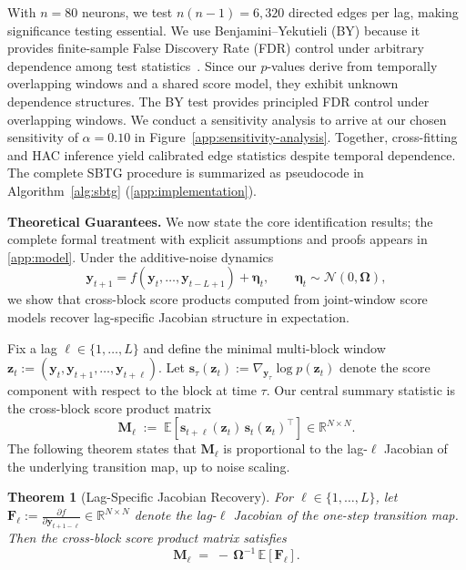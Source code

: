 \documentclass{article}
\theoremstyle{plain}
\newtheorem{theorem}{Theorem}[section]
\theoremstyle{definition}
\theoremstyle{remark}
\newcommand{\R}{\mathbb{R}}
\newcommand{\E}{\mathbb{E}}
\newcommand{\1}{\mathbf{1}}
\newcommand{\y}{\bm{y}}
\newcommand{\z}{\bm{z}}
\newcommand{\s}{\bm{s}}
\begin{document}
With $n=80$ neurons, we test $n(n-1)=6{,}320$ directed edges per lag, making significance testing essential.
We use Benjamini--Yekutieli (BY) because it provides finite-sample False Discovery Rate (FDR) control under arbitrary dependence among test statistics~\citep{BenjaminiYekutieli2001}. Since our $p$-values derive from temporally overlapping windows and a shared score model, they exhibit unknown dependence structures. The BY test provides principled FDR control under overlapping windows. We conduct a sensitivity analysis to arrive at our chosen sensitivity of $\alpha = 0.10$ in Figure~\ref{app:sensitivity-analysis}. Together, cross-fitting and HAC inference yield calibrated edge statistics despite temporal dependence. The complete SBTG procedure is summarized as pseudocode in Algorithm~\ref{alg:sbtg} (\cref{app:implementation}).

\label{sec:theory}
\textbf{Theoretical Guarantees.} We now state the core identification results; the complete formal treatment with explicit assumptions and proofs appears in \cref{app:model}. Under the additive-noise dynamics
\begin{equation}
\y_{t+1} = f(\y_t, \ldots, \y_{t-L+1}) + \bm{\eta}_t,
\qquad
\bm{\eta}_t \sim \mathcal{N}(0, \bm{\Omega}),
\end{equation}
we show that cross-block score products computed from joint-window score models recover lag-specific Jacobian structure in expectation.

Fix a lag $\ell \in \{1,\dots,L\}$ and define the minimal multi-block window $\z_t := (\y_t,\y_{t+1},\ldots,\y_{t+\ell})$. Let $\s_\tau(\z_t) := \nabla_{\y_\tau}\log p(\z_t)$ denote the score component with respect to the block at time $\tau$. Our central summary statistic is the cross-block score product matrix
\begin{equation}
\bm{M}_\ell
\;:=\;
\E\!\left[\s_{t+\ell}(\z_t)\, \s_t(\z_t)^\top\right]
\in \R^{N\times N}.
\end{equation}
The following theorem states that $\bm{M}_\ell$ is proportional to the lag-$\ell$ Jacobian of the underlying transition map, up to noise scaling.

\begin{theorem}[Lag-Specific Jacobian Recovery]
\label{thm:jacobian_main}
For $\ell \in \{1,\dots,L\}$, let $\bm{F}_\ell := \frac{\partial f}{\partial \y_{t+1-\ell}} \in \R^{N\times N}$ denote the lag-$\ell$ Jacobian of the one-step transition map. Then the cross-block score product matrix satisfies
\begin{equation}
\bm{M}_\ell \;=\; -\,\bm{\Omega}^{-1}\,\E[\bm{F}_\ell].
\label{eq:jacobian_main}
\end{equation}
\end{theorem}
\end{document}
